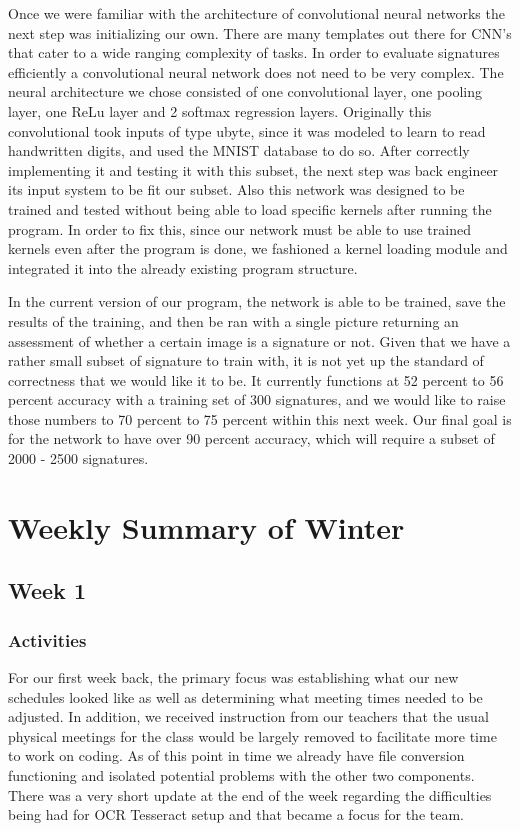 \documentclass[onecolumn, draftclsnofoot,10pt, compsoc]{IEEEtran}
\begin{document}
Once we were familiar with the architecture of convolutional neural networks the next step was initializing our own. There are many templates out there for CNN’s that cater to a wide ranging complexity of tasks. In order to evaluate signatures efficiently a convolutional neural network does not need to be very complex. The neural architecture we chose consisted of one convolutional layer, one pooling layer, one ReLu layer and 2 softmax regression layers. Originally this convolutional took inputs of type ubyte, since it was modeled to learn to read handwritten digits, and used the MNIST database to do so. After correctly implementing it and testing it with this subset, the next step was back engineer its input system to be fit our subset. Also this network was designed to be trained and tested without being able to load specific kernels after running the program. In order to fix this, since our network must be able to use trained kernels even after the program is done, we fashioned a kernel loading module and integrated it into the already existing program structure. 


In the current version of our program, the network is able to be trained, save the results of the training, and then be ran with a single picture returning an assessment of whether a certain image is a signature or not. Given that we have a rather small subset of signature to train with, it is not yet up the standard of correctness that we would like it to be. It currently functions at 52 percent to 56 percent accuracy with a training set of 300 signatures, and we would like to raise those numbers to 70 percent to 75 percent within this next week. Our final goal is for the network to have over 90 percent accuracy, which will require a subset of 2000 - 2500 signatures. 


\section{Weekly Summary of Winter}
\subsection{Week 1}
\subsubsection{Activities}
For our first week back, the primary focus was establishing what our new schedules looked like as well as determining what meeting times needed to be adjusted. In addition, we received instruction from our teachers that the usual physical meetings for the class would be largely removed to facilitate more time to work on coding. As of this point in time we already have file conversion functioning and isolated potential problems with the other two components. There was a very short update at the end of the week regarding the difficulties being had for OCR Tesseract setup and that became a focus for the team.
\end{document}
